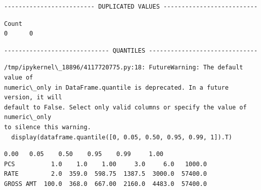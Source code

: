 \documentclass[11pt]{article}
\begin{document}
    
    \begin{Verbatim}[commandchars=\\\{\}]
------------------------- DUPLICATED VALUES --------------------------
    \end{Verbatim}

    
    \begin{Verbatim}[commandchars=\\\{\}]
   Count
0      0
    \end{Verbatim}

    
    \begin{Verbatim}[commandchars=\\\{\}]
----------------------------- QUANTILES ------------------------------
    \end{Verbatim}

    \begin{Verbatim}[commandchars=\\\{\}]
/tmp/ipykernel\_18896/4117720775.py:18: FutureWarning: The default value of
numeric\_only in DataFrame.quantile is deprecated. In a future version, it will
default to False. Select only valid columns or specify the value of numeric\_only
to silence this warning.
  display(dataframe.quantile([0, 0.05, 0.50, 0.95, 0.99, 1]).T)
    \end{Verbatim}

    
    \begin{Verbatim}[commandchars=\\\{\}]
            0.00   0.05    0.50    0.95    0.99     1.00
PCS          1.0    1.0    1.00     3.0     6.0   1000.0
RATE         2.0  359.0  598.75  1387.5  3000.0  57400.0
GROSS AMT  100.0  368.0  667.00  2160.0  4483.0  57400.0
    \end{Verbatim}
\end{document}
